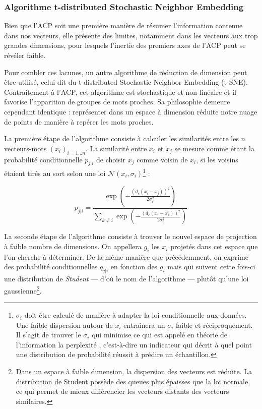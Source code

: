 \documentclass[11pt,french,french]{article}
\let\rmarkdownfootnote\footnote%
\def\footnote{\protect\rmarkdownfootnote}
\begin{document}
\hypertarget{algorithme-t-distributed-stochastic-neighbor-embedding}{%
\subsubsection{Algorithme t-distributed Stochastic Neighbor Embedding}\label{algorithme-t-distributed-stochastic-neighbor-embedding}}

Bien que l'ACP soit une première manière de résumer l'information contenue dans nos vecteurs, elle présente des limites, notamment dans les vecteurs aux trop grandes dimensions, pour lesquels l'inertie des premiers axes de l'ACP peut se révéler faible.

Pour combler ces lacunes, un autre algorithme de réduction de dimension peut être utilisé, celui dit du t-distributed Stochastic Neighbor Embedding (t-SNE).
Contraitement à l'ACP, cet algorithme est stochastique et non-linéaire et il favorise l'apparition de groupes de mots proches.
Sa philosophie demeure cependant identique : représenter dans un espace à dimension réduite notre nuage de points de manière à repérer les mots proches.

La première étape de l'algorithme consiste à calculer les similarités entre les \(n\) vecteurs-mots \((x_i)_{i=1...n}\). La similarité entre \(x_i\) et \(x_j\) se mesure comme étant la probabilité conditionnelle \(p_{j|i}\) de choisir \(x_j\) comme voisin de \(x_i\), si les voisins étaient tirés au sort selon une loi \(\mathcal{N}(x_i, \sigma_i)\)\footnote{\(\sigma_i\) doit être calculé de manière à adapter la loi conditionnelle aux données. Une faible dispersion autour de \(x_i\) entraînera un \(\sigma_i\) faible et réciproquement. Il s'agit de trouver le \(\sigma_i\) qui minimise ce qui est appelé en théorie de l'information la \og perplexité \fg{}, c'est-à-dire un indicateur qui décrit à quel point une distribution de probabilité réussit à prédire un échantillon.} :

\[ p_{j|i} = \frac{
\exp\left(-\frac{(d_e(x_i - x_j))^2}{2\sigma_i^2}\right)
}{
\sum_{k \neq i}
\exp\left(-\frac{(d_e(x_i - x_k))^2}{2\sigma_i^2}\right)
}\]

La seconde étape de l'algorithme consiste à trouver le nouvel espace de projection à faible nombre de dimensions. On appellera \(g_i\) les \(x_i\) projetés dans cet espace que l'on cherche à déterminer. De la même manière que précédemment, on exprime des probabilité conditionnelles \(q_{j|i}\) en fonction des \(g_i\) mais qui suivent cette fois-ci une distribution de \emph{Student} --- d'où le nom de l'algorithme --- plutôt qu'une loi gaussienne\footnote{Dans un espace à faible dimension, la dispersion des vecteurs est réduite. La distribution de Student possède des queues plus épaisses que la loi normale, ce qui permet de mieux différencier les vecteurs distants des vecteurs similaires.}.
\end{document}
